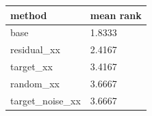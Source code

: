 \begin{tabular}{ll}
\toprule
method & mean rank \\
\midrule
base & 1.8333 \\
residual\_xx & 2.4167 \\
target\_xx & 3.4167 \\
random\_xx & 3.6667 \\
target\_noise\_xx & 3.6667 \\
\bottomrule
\end{tabular}
